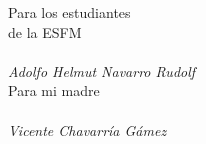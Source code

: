 \begin{dedication}
    {\altone\fontsize{24}{26}\selectfont Para los estudiantes} \\ \vspace{2mm}
    {\altone\fontsize{24}{26}\selectfont de la ESFM} \\
    ~\\
    {\altone\fontsize{14}{16}\selectfont\itshape Adolfo Helmut Navarro Rudolf}\\
    \vspace{2cm}
    {\altone\fontsize{24}{26}\selectfont Para mi madre} \\
    ~\\
    {\altone\fontsize{14}{16}\selectfont\itshape Vicente Chavarría Gámez}
\end{dedication}